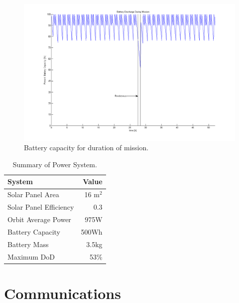 \documentclass[paper=letter, fontsize=11pt]{scrartcl} %
\numberwithin{equation}{section} %
\numberwithin{figure}{section} %
\numberwithin{table}{section} %
\begin{document}
\begin{figure}[H]
    \begin{center}
        \includegraphics[width=.8\textwidth]{figs/BatteryDischarge.png}
        \caption{Battery capacity for duration of mission.}
        \label{fig:battery}
    \end{center}
\end{figure}

\begin{table}[H]
    \begin{center}
        \begin{tabular}{l r}
            \toprule
            System                 & Value    \\
            \midrule
            Solar Panel Area       & 16 m$^2$ \\
            Solar Panel Efficiency & 0.3      \\
            Orbit Average Power    & 975W     \\
            Battery Capacity       & 500Wh    \\
            Battery Mass           & 3.5kg    \\
            Maximum DoD            & 53\%     \\
            \bottomrule
        \end{tabular}
    \end{center}
    \caption{Summary of Power System.}
\end{table}


\section{Communications}
\end{document}
